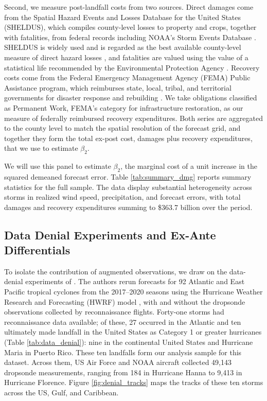 \documentclass[12pt]{article}%
\begin{document}
Second, we measure post-landfall costs from two sources. Direct damages come from the Spatial Hazard Events and Losses Database for the United States (SHELDUS), which compiles county-level losses to property and crops, together with fatalities, from federal records including NOAA's Storm Events Database \citep{sheldus2024}. SHELDUS is widely used and is regarded as the best available county-level measure of direct hazard losses \citep{gallagher2021natural, auh2022natural}, and fatalities are valued using the value of a statistical life recommended by the Environmental Protection Agency \citep{usepa2024guidelines}. Recovery costs come from the Federal Emergency Management Agency (FEMA) Public Assistance program, which reimburses state, local, tribal, and territorial governments for disaster response and rebuilding \citep{kousky2015fema, femaopenfema2024}. We take obligations classified as Permanent Work, FEMA's category for infrastructure restoration, as our measure of federally reimbursed recovery expenditures. Both series are aggregated to the county level to match the spatial resolution of the forecast grid, and together they form the total ex-post cost, damages plus recovery expenditures, that we use to estimate $\beta_{2}$.

We will use this panel to estimate $\beta_{2}$, the marginal cost of a unit increase in the squared demeaned forecast error. Table \ref{tab:summary_dmg} reports summary statistics for the full sample. The data display substantial heterogeneity across storms in realized wind speed, precipitation, and forecast errors, with total damages and recovery expenditures summing to \$363.7 billion over the period.



\subsection{Data Denial Experiments and Ex-Ante Differentials}

To isolate the contribution of augmented observations, we draw on the data-denial experiments of \citet{DitchekEA2023}. The authors rerun forecasts for 92 Atlantic and East Pacific tropical cyclones from the 2017--2020 seasons using the Hurricane Weather Research and Forecasting (HWRF) model \citep{ZhangEA2016,AlakaEA2022}, with and without the dropsonde observations collected by reconnaissance flights. Forty-one storms had reconnaissance data available; of these, 27 occurred in the Atlantic and ten ultimately made landfall in the United States as Category 1 or greater hurricanes (Table \ref{tab:data_denial}): nine in the continental United States and Hurricane Maria in Puerto Rico. These ten landfalls form our analysis sample for this dataset. Across them, US Air Force and NOAA aircraft collected 49,143 dropsonde measurements, ranging from 184 in Hurricane Hanna to 9,413 in Hurricane Florence. Figure \ref{fig:denial_tracks} maps the tracks of these ten storms across the US, Gulf, and Caribbean.
\end{document}

